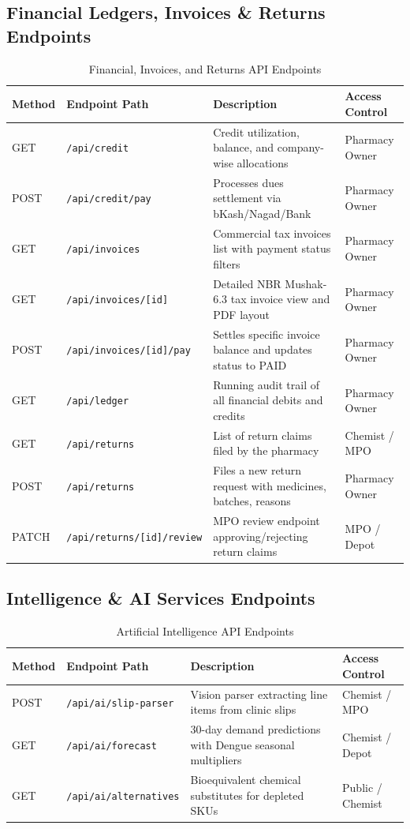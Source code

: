 \documentclass[10pt,a4paper]{article}
\begin{document}
\subsection{Financial Ledgers, Invoices \& Returns Endpoints}
\begin{table}[h!]
\centering
\small
\begin{tabularx}{\textwidth}{lp{4.0cm}Xp{2.5cm}}
\toprule
\textbf{Method} & \textbf{Endpoint Path} & \textbf{Description} & \textbf{Access Control} \\
\midrule
GET & \texttt{/api/credit} & Credit utilization, balance, and company-wise allocations & Pharmacy Owner \\
POST & \texttt{/api/credit/pay} & Processes dues settlement via bKash/Nagad/Bank & Pharmacy Owner \\
GET & \texttt{/api/invoices} & Commercial tax invoices list with payment status filters & Pharmacy Owner \\
GET & \texttt{/api/invoices/[id]} & Detailed NBR Mushak-6.3 tax invoice view and PDF layout & Pharmacy Owner \\
POST & \texttt{/api/invoices/[id]/pay} & Settles specific invoice balance and updates status to PAID & Pharmacy Owner \\
GET & \texttt{/api/ledger} & Running audit trail of all financial debits and credits & Pharmacy Owner \\
GET & \texttt{/api/returns} & List of return claims filed by the pharmacy & Chemist / MPO \\
POST & \texttt{/api/returns} & Files a new return request with medicines, batches, reasons & Pharmacy Owner \\
PATCH & \texttt{/api/returns/[id]/review} & MPO review endpoint approving/rejecting return claims & MPO / Depot \\
\bottomrule
\end{tabularx}
\caption{Financial, Invoices, and Returns API Endpoints}
\end{table}

\subsection{Intelligence \& AI Services Endpoints}
\begin{table}[h!]
\centering
\small
\begin{tabularx}{\textwidth}{lp{4.0cm}Xp{2.5cm}}
\toprule
\textbf{Method} & \textbf{Endpoint Path} & \textbf{Description} & \textbf{Access Control} \\
\midrule
POST & \texttt{/api/ai/slip-parser} & Vision parser extracting line items from clinic slips & Chemist / MPO \\
GET & \texttt{/api/ai/forecast} & 30-day demand predictions with Dengue seasonal multipliers & Chemist / Depot \\
GET & \texttt{/api/ai/alternatives} & Bioequivalent chemical substitutes for depleted SKUs & Public / Chemist \\
\bottomrule
\end{tabularx}
\caption{Artificial Intelligence API Endpoints}
\end{table}
\end{document}

